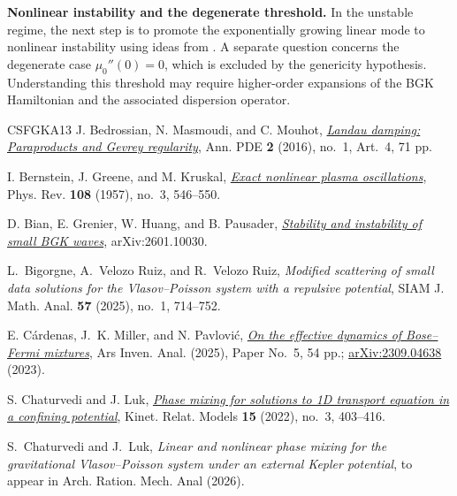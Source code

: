 \documentclass[10pt,reqno]{amsart}
\begin{document}
\smallskip
\noindent\textbf{Nonlinear instability and the degenerate threshold.}
In the unstable regime, the next step is to promote the exponentially growing linear mode to nonlinear instability using ideas from \cite{GS95,L01,L05}. A separate question concerns the degenerate case $\mu_0''(0)=0$, which is excluded by the genericity hypothesis. Understanding this threshold may require higher-order expansions of the BGK Hamiltonian and the associated dispersion operator.

\clearpage
\begingroup
\setlength{\parskip}{0pt}
\begin{thebibliography}{CSFGKA13}
\fontsize{9pt}{10.3pt}\selectfont
\setlength{\itemsep}{1pt}
\setlength{\parsep}{0pt}
J. Bedrossian, N. Masmoudi, and C. Mouhot,
\href{https://link.springer.com/article/10.1007/s40818-016-0008-2}{\emph{Landau damping: Paraproducts and Gevrey regularity}},
Ann. PDE \textbf{2} (2016), no.~1, Art.~4, 71 pp.

I. Bernstein, J. Greene, and M. Kruskal,
\href{https://journals.aps.org/pr/abstract/10.1103/PhysRev.108.546}{\emph{Exact nonlinear plasma oscillations}},
Phys. Rev. \textbf{108} (1957), no.~3, 546--550.

D. Bian, E. Grenier, W. Huang, and B. Pausader,
\href{https://arxiv.org/abs/2601.10030}{\emph{Stability and instability of small BGK waves}},
arXiv:2601.10030.

L.~Bigorgne, A.~Velozo Ruiz, and R.~Velozo Ruiz,
\emph{Modified scattering of small data solutions for the Vlasov--Poisson system with a repulsive potential},
SIAM J. Math. Anal. \textbf{57} (2025), no.~1, 714--752.

E. C\'ardenas, J.~K. Miller, and N. Pavlovi\'c,
\href{https://arxiv.org/abs/2309.04638}{\emph{On the effective dynamics of Bose--Fermi mixtures}},
Ars Inven. Anal. (2025), Paper No.~5, 54 pp.; \href{https://arxiv.org/abs/2309.04638}{arXiv:2309.04638} (2023).

S. Chaturvedi and J. Luk,
\href{https://www.aimsciences.org/article/doi/10.3934/krm.2022002}{\emph{Phase mixing for solutions to 1D transport equation in a confining potential}},
Kinet. Relat. Models \textbf{15} (2022), no.~3, 403--416.

S.~Chaturvedi and J.~Luk,
\emph{Linear and nonlinear phase mixing for the gravitational Vlasov--Poisson system under an external Kepler potential},
to appear in Arch. Ration. Mech. Anal (2026).


\end{thebibliography}
\end{document}
